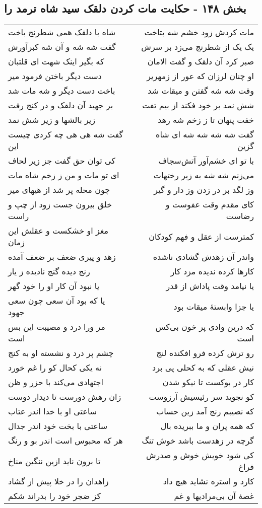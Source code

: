 \begin{center}
\section*{بخش ۱۴۸ - حکایت مات کردن دلقک سید شاه ترمد را}
\label{sec:sh148}
\begin{longtable}{l p{0.5cm} r}
شاه با دلقک همی شطرنج باخت
&&
مات کردش زود خشم شه بتاخت
\\
گفت شه شه و آن شه کبرآورش
&&
یک یک از شطرنج می‌زد بر سرش
\\
که بگیر اینک شهت ای قلتبان
&&
صبر کرد آن دلقک و گفت الامان
\\
دست دیگر باختن فرمود میر
&&
او چنان لرزان که عور از زمهریر
\\
باخت دست دیگر و شه مات شد
&&
وقت شه شه گفتن و میقات شد
\\
بر جهید آن دلقک و در کنج رفت
&&
شش نمد بر خود فکند از بیم تفت
\\
زیر بالشها و زیر شش نمد
&&
خفت پنهان تا ز زخم شه رهد
\\
گفت شه هی هی چه کردی چیست این
&&
گفت شه شه شه شه ای شاه گزین
\\
کی توان حق گفت جز زیر لحاف
&&
با تو ای خشم‌آور آتش‌سجاف
\\
ای تو مات و من ز زخم شاه مات
&&
می‌زنم شه شه به زیر رختهات
\\
چون محله پر شد از هیهای میر
&&
وز لگد بر در زدن وز دار و گیر
\\
خلق بیرون جست زود از چپ و راست
&&
کای مقدم وقت عفوست و رضاست
\\
مغز او خشکست و عقلش این زمان
&&
کمترست از عقل و فهم کودکان
\\
زهد و پیری ضعف بر ضعف آمده
&&
واندر آن زهدش گشادی ناشده
\\
رنج دیده گنج نادیده ز یار
&&
کارها کرده ندیده مزد کار
\\
یا نبود آن کار او را خود گهر
&&
یا نیامد وقت پاداش از قدر
\\
یا که بود آن سعی چون سعی جهود
&&
یا جزا وابستهٔ میقات بود
\\
مر ورا درد و مصیبت این بس است
&&
که درین وادی پر خون بی‌کس است
\\
چشم پر درد و نشسته او به کنج
&&
رو ترش کرده فرو افکنده لنج
\\
نه یکی کحال کو را غم خورد
&&
نیش عقلی که به کحلی پی برد
\\
اجتهادی می‌کند با حزر و ظن
&&
کار در بوکست تا نیکو شدن
\\
زان رهش دورست تا دیدار دوست
&&
کو نجوید سر رئیسیش آرزوست
\\
ساعتی او با خدا اندر عتاب
&&
که نصیبم رنج آمد زین حساب
\\
ساعتی با بخت خود اندر جدال
&&
که همه پران و ما ببریده بال
\\
هر که محبوس است اندر بو و رنگ
&&
گرچه در زهدست باشد خوش تنگ
\\
تا برون ناید ازین ننگین مناخ
&&
کی شود خویش خوش و صدرش فراخ
\\
زاهدان را در خلا پیش از گشاد
&&
کارد و استره نشاید هیچ داد
\\
کز ضجر خود را بدراند شکم
&&
غصهٔ آن بی‌مرادیها و غم
\\
\end{longtable}
\end{center}
